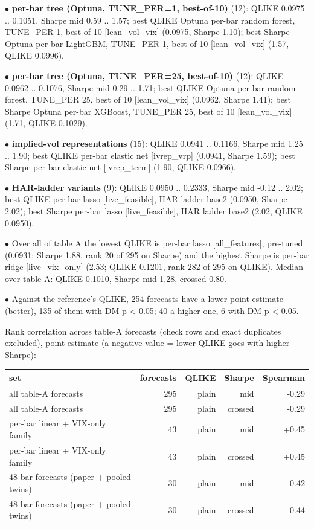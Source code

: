 \documentclass[10pt]{article}
\begin{document}
$\bullet$ \textbf{per-bar tree (Optuna, TUNE\_PER=1, best-of-10)} (12): QLIKE 0.0975 .. 0.1051, Sharpe mid 0.59 .. 1.57; best QLIKE Optuna per-bar random forest, TUNE\_PER 1, best of 10 [lean\_vol\_vix] (0.0975, Sharpe 1.10); best Sharpe Optuna per-bar LightGBM, TUNE\_PER 1, best of 10 [lean\_vol\_vix] (1.57, QLIKE 0.0996).\par
$\bullet$ \textbf{per-bar tree (Optuna, TUNE\_PER=25, best-of-10)} (12): QLIKE 0.0962 .. 0.1076, Sharpe mid 0.29 .. 1.71; best QLIKE Optuna per-bar random forest, TUNE\_PER 25, best of 10 [lean\_vol\_vix] (0.0962, Sharpe 1.41); best Sharpe Optuna per-bar XGBoost, TUNE\_PER 25, best of 10 [lean\_vol\_vix] (1.71, QLIKE 0.1029).\par
$\bullet$ \textbf{implied-vol representations} (15): QLIKE 0.0941 .. 0.1166, Sharpe mid 1.25 .. 1.90; best QLIKE per-bar elastic net [ivrep\_vrp] (0.0941, Sharpe 1.59); best Sharpe per-bar elastic net [ivrep\_term] (1.90, QLIKE 0.0966).\par
$\bullet$ \textbf{HAR-ladder variants} (9): QLIKE 0.0950 .. 0.2333, Sharpe mid -0.12 .. 2.02; best QLIKE per-bar lasso [live\_feasible], HAR ladder base2 (0.0950, Sharpe 2.02); best Sharpe per-bar lasso [live\_feasible], HAR ladder base2 (2.02, QLIKE 0.0950).\par
$\bullet$ Over all of table A the lowest QLIKE is per-bar lasso [all\_features], pre-tuned (0.0931; Sharpe 1.88, rank 20 of 295 on Sharpe) and the highest Sharpe is per-bar ridge [live\_vix\_only] (2.53; QLIKE 0.1201, rank 282 of 295 on QLIKE). Median over table A: QLIKE 0.1010, Sharpe mid 1.28, crossed 0.80.\par
$\bullet$ Against the reference's QLIKE, 254 forecasts have a lower point estimate (better), 135 of them with DM p < 0.05; 40 a higher one, 6 with DM p < 0.05.\par
Rank correlation across table-A forecasts (check rows and exact duplicates excluded), point estimate (a negative value = lower QLIKE goes with higher Sharpe):\par
\begingroup\scriptsize\setlength{\tabcolsep}{2.5pt}
\begin{longtable}{lrrrr}
\toprule
set & forecasts & QLIKE & Sharpe & Spearman \\
\midrule
all table-A forecasts & 295 & plain & mid & -0.29 \\
all table-A forecasts & 295 & plain & crossed & -0.29 \\
per-bar linear + VIX-only family & 43 & plain & mid & +0.45 \\
per-bar linear + VIX-only family & 43 & plain & crossed & +0.45 \\
48-bar forecasts (paper + pooled twins) & 30 & plain & mid & -0.42 \\
48-bar forecasts (paper + pooled twins) & 30 & plain & crossed & -0.44 \\
\bottomrule
\end{longtable}
\endgroup
\end{document}
